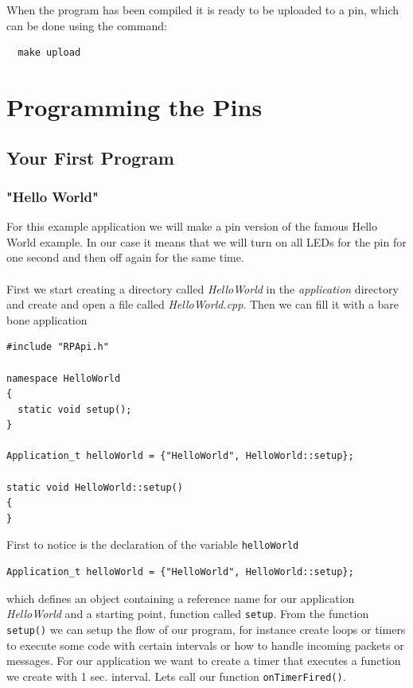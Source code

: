 \documentclass[a4paper, twoside, final]{book}%
\begin{document}
When the program has been compiled it is ready to be uploaded to a pin, which can be done using the command:

\begin{lstlisting}
  make upload
\end{lstlisting}

\part{Programming the Pins}

\chapter{Your First Program}
\section{"Hello World"}
\label{hello_world}

For this example application we will make a pin version of the famous Hello World example. In our case it means that we will turn on all LEDs for the pin for one second and then off again for the same time.\\
\\
First we start creating a directory called \emph{HelloWorld} in the \emph{application} directory and create and open a file called \emph{HelloWorld.cpp}. Then we can fill it with a bare bone application

\begin{lstlisting}
#include "RPApi.h"

namespace HelloWorld
{
  static void setup();
}

Application_t helloWorld = {"HelloWorld", HelloWorld::setup};

static void HelloWorld::setup()
{
}
\end{lstlisting}

First to notice is the declaration of the variable \texttt{helloWorld}

\begin{lstlisting}
Application_t helloWorld = {"HelloWorld", HelloWorld::setup};
\end{lstlisting}

which defines an object containing a reference name for our application \emph{HelloWorld} and a starting point, function called \texttt{setup}.
From the function \texttt{setup()} we can setup the flow of our program, for instance create loops or timers to execute some code with certain intervals or how to handle incoming packets or messages.
For our application we want to create a timer that executes a function we create with 1 sec. interval. Lets call our function \texttt{onTimerFired()}.
\end{document}
